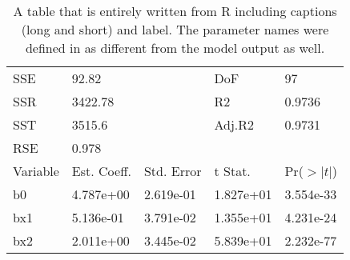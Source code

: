\begin{table}[h!]
\caption[OLS table all from R]{A table that is entirely written from R including captions (long and short) and label. The parameter names were defined in as different from the model output as well.}\label{ols2}\begin{center}
\begin{tabular}{l l l l l}

\hline
SSE	&	92.82	&		&	DoF	&	97\\ 
SSR	&	3422.78	&		&	R2	&	0.9736\\ 
SST	&	3515.6	&		&	Adj.R2	&	0.9731\\ 
RSE	&	0.978	&		&		&	\\ 
\hline
Variable	&	Est. Coeff.	&	Std. Error	&	t Stat.	&	Pr($>|t|$)\\ 
\hline
b0	&	4.787e+00	&	2.619e-01	&	1.827e+01	&	3.554e-33\\ 
bx1	&	5.136e-01	&	3.791e-02	&	1.355e+01	&	4.231e-24\\ 
bx2	&	2.011e+00	&	3.445e-02	&	5.839e+01	&	2.232e-77\\ 
\hline\end{tabular}
\end{center}
\end{table}